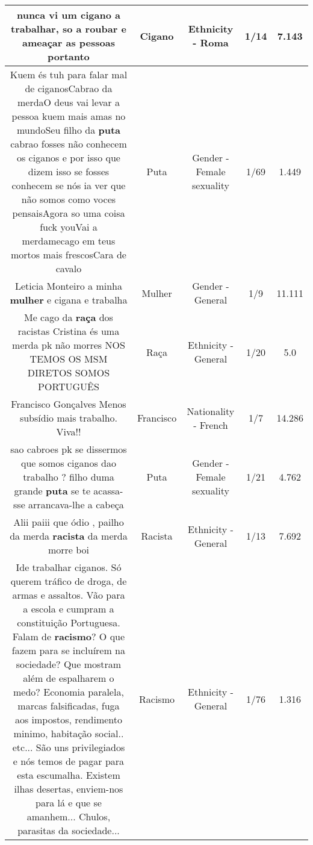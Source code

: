\documentclass[11pt]{article}
\newlength\mylength
\begin{document}
\begin{center}
\begin{longtable}{|C{.65\mylength}|C{.30\mylength}|C{.12\mylength}|C{.12\mylength}|C{.12\mylength}|}
  \small nunca vi um \textbf{cigano} a trabalhar, so a roubar e ameaçar as pessoas portanto\normalsize   & Cigano & Ethnicity - Roma & 1/14 & 7.143 \\  \hline
  \small Kuem és tuh para falar mal de ciganosCabrao da merdaO deus vai levar a pessoa kuem mais amas no mundoSeu filho da \textbf{puta} cabrao fosses não conhecem os ciganos e por isso que dizem isso se fosses conhecem se nós ia ver que não somos como voces pensaisAgora so uma coisa fuck youVai a merdamecago em teus mortos mais frescosCara de cavalo\normalsize   & Puta & Gender - Female sexuality & 1/69 & 1.449 \\  \hline
  \small Leticia Monteiro a minha \textbf{mulher} e cigana e trabalha\normalsize   & Mulher & Gender - General & 1/9 & 11.111 \\  \hline
  \small Me cago da \textbf{raça} dos racistas  Cristina és uma merda pk não morres  NOS TEMOS OS MSM DIRETOS SOMOS PORTUGUÊS\normalsize   & Raça & Ethnicity - General & 1/20 & 5.0 \\  \hline
  \small Francisco Gonçalves Menos subsídio mais trabalho. Viva!!\normalsize   & Francisco & Nationality - French & 1/7 & 14.286 \\  \hline
  \small sao cabroes pk se dissermos que somos ciganos dao trabalho ? filho duma grande \textbf{puta} se te acassa-sse arrancava-lhe a cabeça\normalsize   & Puta & Gender - Female sexuality & 1/21 & 4.762 \\  \hline
  \small Alii paiii que ódio , pailho da merda \textbf{racista} da merda morre boi\normalsize   & Racista & Ethnicity - General & 1/13 & 7.692 \\  \hline
  \small Ide trabalhar ciganos. Só querem tráfico de droga, de armas e assaltos. Vão para a escola e cumpram a constituição Portuguesa. Falam de \textbf{racismo}? O que fazem para se incluírem na sociedade? Que mostram além de espalharem o medo? Economia paralela, marcas falsificadas, fuga aos impostos, rendimento minimo, habitação social.. etc... São uns privilegiados e nós temos de pagar para esta escumalha. Existem ilhas desertas, enviem-nos para lá e que se amanhem... Chulos, parasitas da sociedade...\normalsize   & Racismo & Ethnicity - General & 1/76 & 1.316 \\  \hline

\end{longtable}
\end{center}
\end{document}
